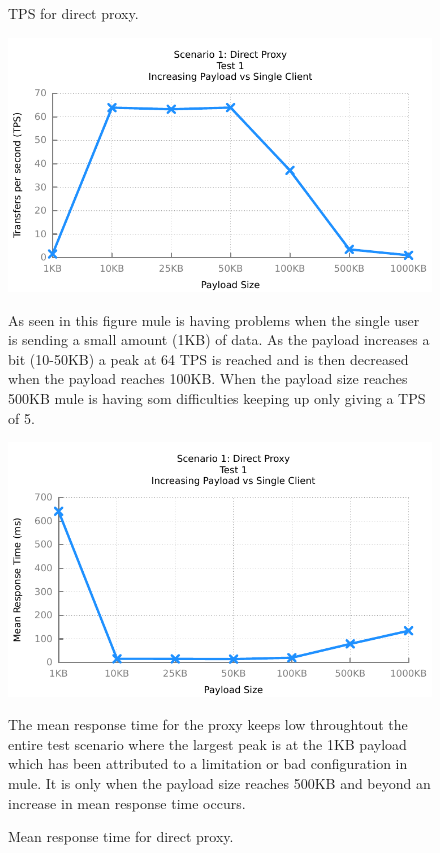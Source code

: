 \newpage
\begin{figure}[H]
	\caption{TPS for direct proxy.}
	\centerline{\includegraphics{img/proxy_fu_ip_tps}}
	\label{fig:proxy-1-1}
	As seen in this figure mule is having problems when the single user is sending a small amount (1KB) of data. 
	As the payload increases a bit (10-50KB) a peak at 64 TPS is reached and is then decreased when the payload reaches 100KB.
	When the payload size reaches 500KB mule is having som difficulties keeping up only giving a TPS of 5.

	\caption{Mean response time for direct proxy.}
	\centerline{\includegraphics{img/proxy_fu_ip_resp}}
	\label{fig:proxy-1-2}
	The mean response time for the proxy keeps low throughtout the entire test scenario where the largest peak is at the 1KB payload which has been attributed to a limitation or bad configuration in mule.
	It is only when the payload size reaches 500KB and beyond an increase in mean response time occurs.
\end{figure}

